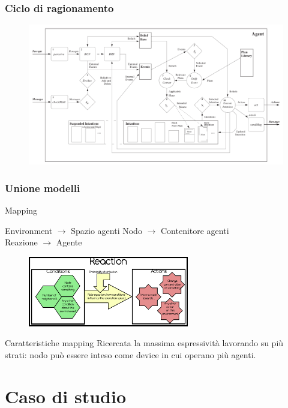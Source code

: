 \documentclass[handout]{beamer}\mode<presentation>{\usetheme{AMSCesenaBleu}}
\begin{document}
\begin{frame}
\frametitle{Ciclo di ragionamento}
\begin{figure}
\hspace*{-0.35cm}
\includegraphics[width=12.5cm]{images/reasoningCicle.png}
\end{figure}
\end{frame}

\begin{frame}
\frametitle{Unione modelli}
\begin{block}{Mapping}
\begin{center}
\alert{Environment} $\rightarrow$ Spazio agenti \hspace{1.5cm} \alert{Nodo} $\rightarrow$ Contenitore agenti \\
\alert{Reazione} $\rightarrow$ Agente
\end{center}
\end{block}
\begin{figure}
\includegraphics[width=7cm]{images/alchemistReaction.png}
\end{figure}

\begin{block}{Caratteristiche mapping}
Ricercata la massima espressività lavorando su più strati: nodo può essere inteso come device in cui operano più agenti.
\end{block}
\end{frame}



\section{Caso di studio}
\end{document}
